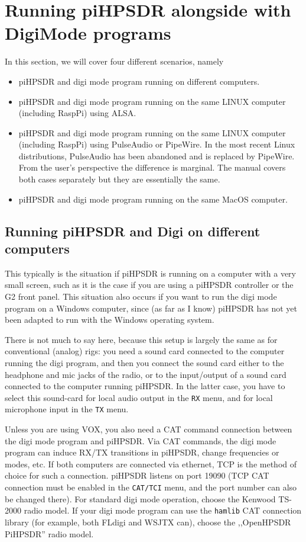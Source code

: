 \documentclass[12pt]{book}
\def\bltt#1{\texttt{\color{blue}#1}}
\def\pH{pi\-HPSDR\xspace}
\begin{document}
\chapter[\pH and digi mode programs]{Running \pH alongside with DigiMode programs}

In this section, we will cover four different scenarios, namely
\begin{itemize}
\item{\pH and digi mode program running on different computers.}
\item{\pH and digi mode program running on the same LINUX computer
(including RaspPi) using ALSA.}
\item{\pH and digi mode program running on the same LINUX computer
(including RaspPi) using PulseAudio or PipeWire. {\color{red} In the most recent Linux distributions,
 PulseAudio has been abandoned and is replaced by
PipeWire. From the user's perspective the difference is marginal.
The manual covers both cases separately but they are essentially the same.}}
\item{\pH and digi mode program running on the same MacOS computer.}
\end{itemize}



\section[\pH and Digi on different computers]{Running \pH and Digi on different computers}

This typically is the situation if \pH is running on a computer with a very small
screen, such as it is the case if you are using a \pH controller or the G2 front panel.
This situation also occurs if you want to run the digi mode program on a Windows computer,
since (as far as I know) \pH has not yet been adapted to run with the Windows operating
system.

There is not much to say here, because this setup is largely the same as for conventional
(analog) rigs: you need a sound card connected to the computer running the digi program,
and then you connect the sound card either to the headphone and mic jacks of the radio,
or to the input/output of a sound card connected to the computer running \pH. In the
latter case, you have to select this sound-card for local audio output in the \bltt{RX} menu,
and for local microphone input in the \bltt{TX} menu.

Unless you are using VOX, you also need a CAT command connection between the digi mode program
and \pH. Via CAT commands, the digi mode program can induce RX/TX transitions in \pH,
change frequencies or modes, etc. If both computers are connected via ethernet,
TCP is the method of choice for such a connection. \pH listens on port 19090 (TCP CAT
connection must be enabled in the \bltt{CAT/TCI} menu, and the port number can also
be changed there). For standard digi mode operation, choose the
Kenwood TS-2000 radio model. If your digi mode program can use the \texttt{hamlib} CAT connection
library (for example, both FLdigi and WSJTX can), choose the ,,OpenHPSDR PiHPSDR'' radio
model.
\end{document}

